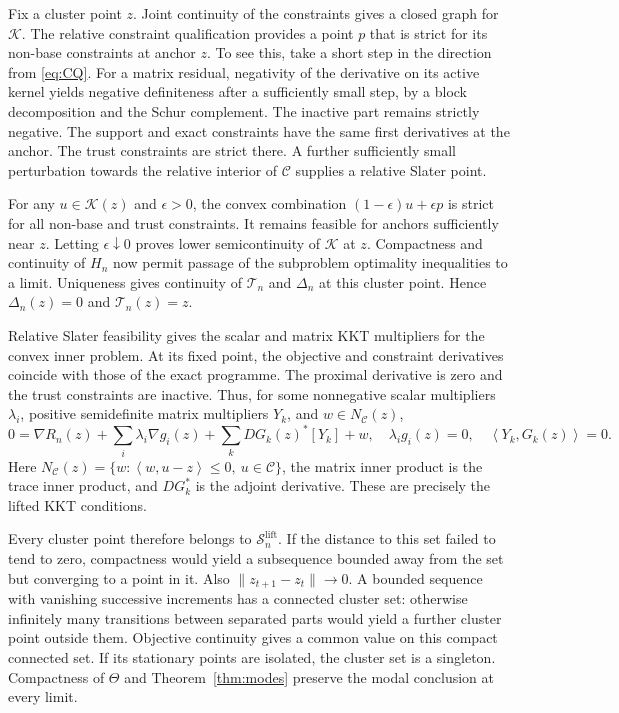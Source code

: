 \documentclass[12pt,a4paper]{article}
\theoremstyle{remark}
\newcommand{\ip}[2]{\left\langle#1,#2\right\rangle}
\begin{document}
Fix a cluster point $z$. Joint continuity of the constraints gives a closed graph for $\mathcal K$. The relative constraint qualification provides a point $p$ that is strict for its non-base constraints at anchor $z$. To see this, take a short step in the direction from \eqref{eq:CQ}. For a matrix residual, negativity of the derivative on its active kernel yields negative definiteness after a sufficiently small step, by a block decomposition and the Schur complement. The inactive part remains strictly negative. The support and exact constraints have the same first derivatives at the anchor. The trust constraints are strict there. A further sufficiently small perturbation towards the relative interior of $\mathcal C$ supplies a relative Slater point.

For any $u\in\mathcal K(z)$ and $\epsilon>0$, the convex combination
$(1-\epsilon)u+\epsilon p$ is strict for all non-base and trust constraints. It remains feasible for anchors sufficiently near $z$. Letting $\epsilon\downarrow0$ proves lower semicontinuity of $\mathcal K$ at $z$. Compactness and continuity of $H_n$ now permit passage of the subproblem optimality inequalities to a limit. Uniqueness gives continuity of $\mathcal T_n$ and $\Delta_n$ at this cluster point. Hence $\Delta_n(z)=0$ and $\mathcal T_n(z)=z$.

Relative Slater feasibility gives the scalar and matrix KKT multipliers for the convex inner problem. At its fixed point, the objective and constraint derivatives coincide with those of the exact programme. The proximal derivative is zero and the trust constraints are inactive. Thus, for some nonnegative scalar multipliers $\lambda_i$, positive semidefinite matrix multipliers $Y_k$, and $w\in N_{\mathcal C}(z)$,
\[
 0=\nabla R_n(z)+\sum_i\lambda_i\nabla g_i(z)
       +\sum_kDG_k(z)^*[Y_k]+w,
 \quad
 \lambda_i g_i(z)=0,\quad
 \ip{Y_k}{G_k(z)}=0.
\]
Here $N_{\mathcal C}(z)=\{w:\ip{w}{u-z}\le0,\ u\in\mathcal C\}$, the matrix inner product is the trace inner product, and $DG_k^*$ is the adjoint derivative. These are precisely the lifted KKT conditions.

Every cluster point therefore belongs to $\mathcal S_n^{\mathrm{lift}}$. If the distance to this set failed to tend to zero, compactness would yield a subsequence bounded away from the set but converging to a point in it. Also $\|z_{t+1}-z_t\|\to0$. A bounded sequence with vanishing successive increments has a connected cluster set: otherwise infinitely many transitions between separated parts would yield a further cluster point outside them. Objective continuity gives a common value on this compact connected set. If its stationary points are isolated, the cluster set is a singleton. Compactness of $\Theta$ and Theorem~\ref{thm:modes} preserve the modal conclusion at every limit.
\end{document}
